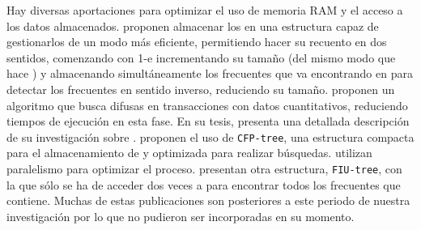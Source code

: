  
 
 
 
 Hay diversas aportaciones para optimizar el uso de memoria RAM y el acceso a los datos almacenados.
  \citet{LinKedem-PincerSearchFIM-2002} proponen almacenar los \itemsets en una estructura capaz de gestionarlos de un modo más eficiente, permitiendo hacer su recuento en dos sentidos, comenzando con 1-\itemsets e incrementando su tamaño (del mismo modo que hace \apriori) y almacenando simultáneamente los \kitemsets frecuentes que va encontrando en \D para detectar los frecuentes en sentido inverso, reduciendo su tamaño.
  \citet{HongKuoWang-FuzzyAprioriTID-2004} proponen un algoritmo que busca \ars difusas en transacciones con datos cuantitativos, reduciendo tiempos de ejecución en esta fase.
  En su tesis, \citet{Tesis-Liu-SupportingEfficientAndScalableFrequentPatternMining-2005} presenta una detallada descripción de su investigación sobre \fim.
   \citet{LiuLuYu-CFPtreeCompactDiskBasedStructureForStoringAndQueryingFI-2007} proponen el uso de \texttt{{CFP}-tree}, una estructura compacta para el almacenamiento de \itemsets y optimizada para realizar búsquedas.
  \citet{LiuLiZhangTang-OptimizationOfFIMOnMultipleCoreProcessor-2007} utilizan paralelismo para optimizar el proceso.
  \citet{TsayHsuYu-FIUTaNewMethodForFIM-2009} presentan otra estructura, \texttt{FIU-tree}, con la que sólo se ha de acceder dos veces a \D para encontrar todos los \itemsets frecuentes que contiene.
  Muchas de estas publicaciones son posteriores a este periodo de nuestra investigación por lo que no pudieron ser incorporadas en su momento. 



 
